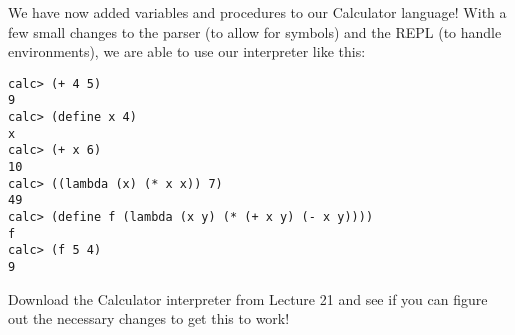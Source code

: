We have now added variables and procedures to our Calculator language! With a
few small changes to the parser (to allow for symbols) and the REPL (to handle
environments), we are able to use our interpreter like this:\\

\begin{lstlisting}
calc> (+ 4 5)
9
calc> (define x 4)
x
calc> (+ x 6)
10
calc> ((lambda (x) (* x x)) 7)
49
calc> (define f (lambda (x y) (* (+ x y) (- x y))))
f
calc> (f 5 4)
9
\end{lstlisting}

Download the Calculator interpreter from Lecture 21 and see if you can figure
out the necessary changes to get this to work!
